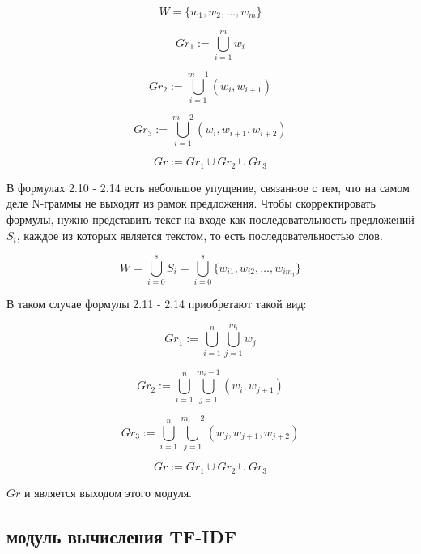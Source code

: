 \documentclass[a4paper,12pt,preview]{report} %
\begin{document}
	\begin{equation}
	W = \{w_1, w_2, \dots, w_m\}
	\end{equation}
	
	\begin{equation}
	Gr_1 := \bigcup_{i=1}^{m} w_i
	\end{equation}
	
	\begin{equation}
	Gr_2 := \bigcup_{i=1}^{m-1} (w_i, w_{i+1})
	\end{equation}
	
	\begin{equation}
	Gr_3 := \bigcup_{i=1}^{m-2} (w_i, w_{i+1}, w_{i+2})
	\end{equation}
	
	\begin{equation}
	Gr := Gr_1 \cup Gr_2 \cup Gr_3
	\end{equation}
	
	В формулах 2.10 - 2.14 есть небольшое упущение, связанное с тем, что на самом деле N-граммы не выходят из рамок предложения. Чтобы скорректировать формулы, нужно представить текст на входе как последовательность предложений $S_i$, каждое из которых является текстом, то есть последовательностью слов.
	
	\begin{equation}
	W = \bigcup_{i=0}^{s} S_i = \bigcup_{i=0}^{s} \{w_{i1}, w_{i2}, \dots, w_{im_i}\}
	\end{equation}
	
	В таком случае формулы 2.11 - 2.14 приобретают такой вид:
	
	\begin{equation}
	Gr_1 := \bigcup_{i=1}^n\bigcup_{j=1}^{m_i} w_j
	\end{equation}
	
	\begin{equation}
	Gr_2 := \bigcup_{i=1}^n\bigcup_{j=1}^{m_i-1} (w_i, w_{j+1})
	\end{equation}
	
	\begin{equation}
	Gr_3 := \bigcup_{i=1}^n\bigcup_{j=1}^{m_i-2} (w_j, w_{j+1}, w_{j+2})
	\end{equation}
	
	\begin{equation}
	Gr := Gr_1 \cup Gr_2 \cup Gr_3
	\end{equation}
	
	$Gr$ и является выходом этого модуля.
	
	\subsection{модуль вычисления TF-IDF}
	
\end{document}

